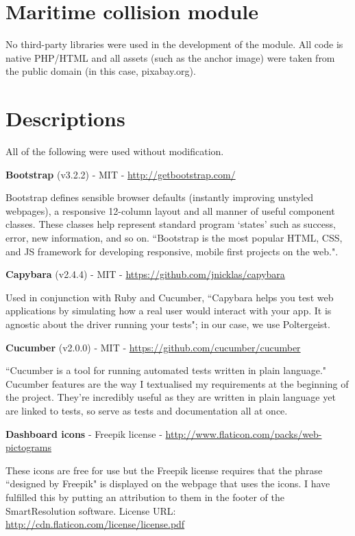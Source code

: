 \section{Maritime collision module}

No third-party libraries were used in the development of the module. All code is native PHP/HTML and all assets (such as the anchor image) were taken from the public domain (in this case, pixabay.org).

\section{Descriptions}

All of the following were used without modification.

\textbf{Bootstrap} (v3.2.2) - MIT - \url{http://getbootstrap.com/}

Bootstrap defines sensible browser defaults (instantly improving unstyled webpages), a responsive 12-column layout and all manner of useful component classes. These classes help represent standard program `states' such as success, error, new information, and so on. ``Bootstrap is the most popular HTML, CSS, and JS framework for developing responsive, mobile first projects on the web.". 

\textbf{Capybara} (v2.4.4) - MIT - \url{https://github.com/jnicklas/capybara}

Used in conjunction with Ruby and Cucumber, ``Capybara helps you test web applications by simulating how a real user would interact with your app. It is agnostic about the driver running your tests"; in our case, we use Poltergeist. 

\textbf{Cucumber} (v2.0.0) - MIT - \url{https://github.com/cucumber/cucumber}

``Cucumber is a tool for running automated tests written in plain language." Cucumber features are the way I textualised my requirements at the beginning of the project. They're incredibly useful as they are written in plain language yet are linked to tests, so serve as tests and documentation all at once.

\textbf{Dashboard icons} - Freepik license - \url{http://www.flaticon.com/packs/web-pictograms}

These icons are free for use but the Freepik license requires that the phrase ``designed by Freepik" is displayed on the webpage that uses the icons. I have fulfilled this by putting an attribution to them in the footer of the SmartResolution software. License URL: \url{http://cdn.flaticon.com/license/license.pdf}

